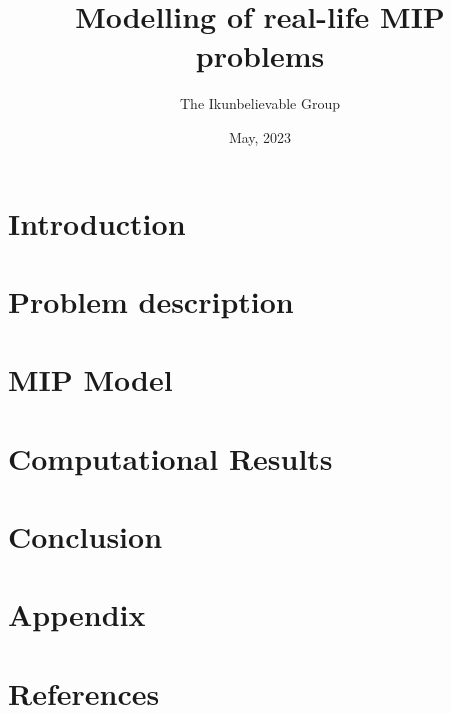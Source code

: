 \documentclass[11pt]{article}
\title{Modelling of real-life MIP problems}
\author{The Ikunbelievable Group}
\date{May, 2023}
\begin{document}
\maketitle
\section{Introduction}
\section{Problem description}
\section{MIP Model}
\section{Computational Results}
\section{Conclusion}
\section{Appendix}
\section{References}
\end{document}
